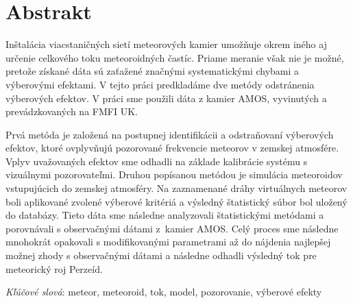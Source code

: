 \section*{Abstrakt}
    Inštalácia viacstaničných sietí meteorových kamier umožňuje okrem iného aj určenie celkového toku meteoroidných častíc.
    Priame meranie však nie je možné, pretože získané dáta sú zaťažené značnými systematickými chybami a výberovými efektami.
    V tejto práci predkladáme dve metódy odstránenia výberových efektov.
    V práci sme použili dáta z kamier AMOS, vyvinutých a prevádzkovaných na FMFI UK.

    Prvá metóda je založená na postupnej identifikácii a odstraňovaní výberových efektov,
    ktoré ovplyvňujú pozorované frekvencie meteorov v zemskej atmosfére.
    Vplyv uvažovaných efektov sme odhadli na základe kalibrácie systému s vizuálnymi pozorovateľmi.
    Druhou popísanou metódou je simulácia meteoroidov vstupujúcich do zemskej atmosféry.
    Na zaznamenané dráhy virtuálnych meteorov boli aplikované zvolené výberové kritériá
    a výsledný štatistický súbor bol uložený do databázy. Tieto dáta sme následne
    analyzovali štatistickými metódami a porovnávali s observačnými dátami z~kamier AMOS.
    Celý proces sme následne mnohokrát opakovali s modifikovanými parametrami
    až do nájdenia najlepšej možnej zhody s observačnými dátami
    a následne odhadli výsledný tok pre meteorický roj Perzeíd.
    
    \emph{Kľúčové slová}: meteor, meteoroid, tok, model, pozorovanie, výberové efekty
